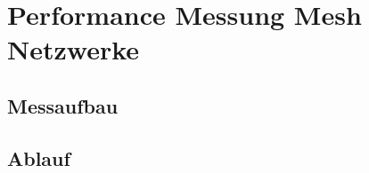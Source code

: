 \clearpage
\section{Performance Messung Mesh Netzwerke}\label{sec:PerformanceMessungMeshNetzwerke}

\subsection{Messaufbau}\label{sec:Messaufbau}

\subsection{Ablauf}\label{sec:Ablauf}



